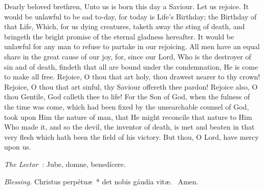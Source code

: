 {{    \begin{parcolumns}[rulebetween,colwidths={1=.51\linewidth}]{2}
    {Dearly beloved brethren, Unto us is born this day a Saviour. Let us rejoice. It would be unlawful to be sad to-day, for today is Life's Birthday; the Birthday of that Life, Which, for us dying creatures, taketh away the sting of death, and bringeth the bright promise of the eternal gladness hereafter. It would be unlawful for any man to refuse to partake in our rejoicing. All men have an equal share in the great cause of our joy, for, since our Lord, Who is the destroyer of sin and of death, findeth that all are bound under the condemnation, He is come to make all free. Rejoice, O thou that art holy, thou drawest nearer to thy crown! Rejoice, O thou that art sinful, thy Saviour offereth thee pardon! Rejoice also, O thou Gentile, God calleth thee to life! For the Son of God, when the fulness of the time was come, which had been fixed by the unsearchable counsel of God, took upon Him the nature of man, that He might reconcile that nature to Him Who made it, and so the devil, the inventor of death, is met and beaten in that very flesh which hath been the field of his victory.
      But thou, O Lord, have mercy upon us.}
    \end{parcolumns}

  }

  {
    \medskip

    \emph{The Lector~:} Jube, domne, benedícere.

    \emph{Blessing.} Christus perpétuæ~* det nobis gáudia vitæ. \Rbar{}~Amen.
  }

}
